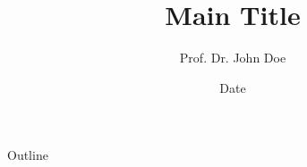 \documentclass[10pt,compress]{beamer} %
\title[Your Short Title]{Main Title}
\author{Prof. Dr. John Doe}
\institute{Departamento de Automática}
\date{Date}
\begin{document}
{\titlepageBlue
    \begin{frame}
        \titlepage
    \end{frame}
}

{\titlepageWhite
    \begin{frame}
        \titlepage
    \end{frame}
}

{
    \begin{frame}{Outline}
        \tableofcontents
    \end{frame}
}

\addtocounter{framenumber}{-1} %

\end{document}
